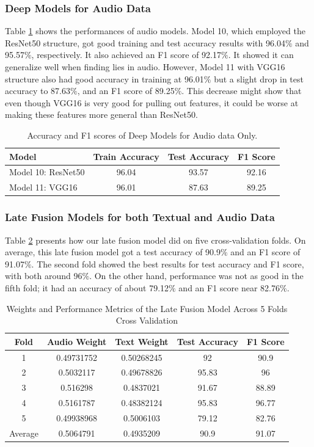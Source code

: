 \documentclass[12pt]{article}
\begin{document}
\subsubsection{Deep Models for Audio Data}
Table \ref{tab:ResultAudio} shows the performances of audio models. Model 10, which employed the ResNet50 structure, got good training and test accuracy results with 96.04$\%$ and 95.57$\%$, respectively. It also achieved an F1 score of 92.17$\%$. It showed it can generalize well when finding lies in audio. However, Model 11 with VGG16 structure also had good accuracy in training at 96.01$\%$ but a slight drop in test accuracy to 87.63$\%$, and an F1 score of 89.25$\%$. This decrease might show that even though VGG16 is very good for pulling out features, it could be worse at making these features more general than ResNet50.
\begin{table}[H]
\centering
\begin{tabular}{l c c c}
\hline
\textbf{Model} & \textbf{Train Accuracy} & \textbf{Test Accuracy} & \textbf{F1 Score} \\
\hline
Model 10: ResNet50 & 96.04 &  93.57 & 92.16 \\
Model 11: VGG16  & 96.01 &  87.63 & 89.25 \\
\hline
\end{tabular}
\caption{Accuracy and F1 scores of Deep Models for Audio data Only.}
\label{tab:ResultAudio}
\end{table}

\subsubsection{Late Fusion Models for both Textual and Audio Data}
Table \ref{tab:myTab3}  presents how our late fusion model did on five cross-validation folds. On average, this late fusion model got a test accuracy of 90.9$\%$ and an F1 score of 91.07$\%$. The second fold showed the best results for test accuracy and F1 score, with both around 96$\%$.  On the other hand, performance was not as good in the fifth fold; it had an accuracy of about 79.12$\%$ and an F1 score near 82.76$\%$. 
\begin{table}[H]
\centering
\begin{tabular}{c c c c c}
\hline
\textbf{Fold} & \textbf{Audio Weight}  & \textbf{Text Weight} & \textbf{Test Accuracy} & \textbf{F1 Score} \\
\hline
1 & 0.49731752  & 0.50268245 & 92 & 90.9 \\
2 & 0.5032117  & 0.49678826 & 95.83 & 96 \\
3 & 0.516298   & 0.4837021  & 91.67 & 88.89 \\
4&  0.5161787  & 0.48382124 & 95.83 & 96.77 \\ 
5& 0.49938968 &  0.5006103 & 79.12 & 82.76 \\ 
\hline
Average& 0.5064791 & 0.4935209 & 90.9 & 91.07 \\ 
\hline
\end{tabular}
\caption{Weights and Performance Metrics of the Late Fusion Model Across 5 Folds Cross Validation}
\label{tab:myTab3}
\end{table}
\end{document}

